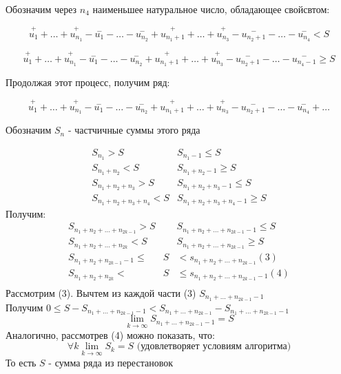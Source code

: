\documentclass[12pt]{article}
\let\oldlim\lim
\renewcommand{\lim}{\oldlim\limits}
\begin{document}
\begin{adjustwidth}{1.5em}{1.5em}
    Обозначим через $n_4$ наименьшее натуральное число, обладающее свойсвтом:

    \[\overset{+}{u_1}+\dots+\overset{+}{u_{n_1}}-\overset{-}{u_1}-\dots-\overset{-}{u_{n_2}}+\overset{+}{u_{n_1+1}}+\dots+\overset{+}{u_{n_3}}-\overset{-}{u_{n_2+1}}-\dots-\overset{-}{u_{n_4}} < S\]

    \[\overset{+}{u_1}+\dots+\overset{+}{u_{n_1}}-\overset{-}{u_1}-\dots-\overset{-}{u_{n_2}}+\overset{+}{u_{n_1+1}}+\dots+\overset{+}{u_{n_3}}-\overset{-}{u_{n_2+1}}-\dots-\overset{-}{u_{n_4-1}} \geq S\]
    

    Продолжая этот процесс, получим ряд:

    \[\overset{+}{u_1}+\dots+\overset{+}{u_{n_1}}-\overset{-}{u_1}-\dots-\overset{-}{u_{n_2}}+\overset{+}{u_{n_1+1}}+\dots+\overset{+}{u_{n_3}}-\overset{-}{u_{n_2+1}}-\dots-\overset{-}{u_{n_4}}+\dots\]
  
    Обозначим $S_n$ - частчичные суммы этого ряда

    \[\begin{matrix}
      S_{n_1}>S & S_{n_1-1}\leq S\\
      S_{n_1+n_2}<S & S_{n_1+n_2-1}\geq S\\
      S_{n_1+n_2+n_3} > S & S_{n_1+n_2+n_3-1} \leq S\\
      S_{n_1+n_2+n_3+n_4} < S & S_{n_1+n_2+n_3+n_4-1} \geq S
    \end{matrix}\]
    Получим:
    \[\begin{matrix}
      S_{n_1+n_2+\dots+n_{2k-1}} > S & & S_{n_1+n_2+\dots+n_{2k-1}-1} \leq S\\
      S_{n_1+n_2+\dots+n_{2k}} < S & &  S_{n_1+n_2+\dots+n_{2k-1}} \geq S\\
      S_{n_1+n_2+n_{2k-1}-1} \leq & S & < s_{n_1+n_2+\dots+n_{2k-1}}(3)\\
      S_{n_1+n_2+n_{2k}} < & S & \leq s_{n_1+n_2+\dots+n_{2k-1}-1}(4)\\
    \end{matrix}\]
    Рассмотрим (3). Вычтем из каждой части (3) $S_{n_1+\dots+n_{2k-1}-1}$\\
    Получим $0\leq S - S_{n_1+\dots+n_{2k-1}-1} < S_{n_1+\dots+n_{2k-1}} - S_{n_1+\dots+n_{2k-1}-1}$
    \[\lim_{k \to \infty} S_{n_1+\dots+n_{2k-1}-1} = S\]
    Аналогично, рассмотрев (4) можно показать, что:
    \[\forall k \lim_{k \to \infty} S_k =S \text{ (удовлетворяет условиям алгоритма)}\]
    То есть $S$ - сумма ряда из перестановок
  \end{adjustwidth}
\end{document}
